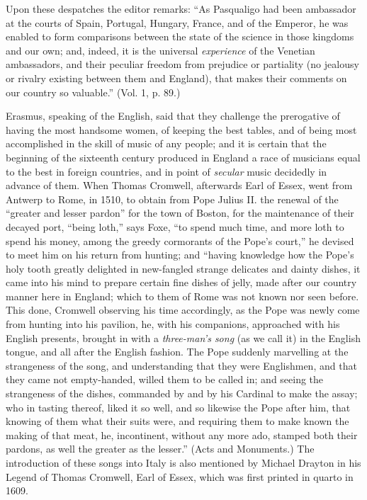 Upon these despatches the editor remarks: “As Pasqualigo had been ambassador
at the courts of Spain, Portugal, Hungary, France, and of the Emperor, he was
enabled to form comparisons between the state of the science in those kingdoms
and our own; and, indeed, it is the universal \textit{experience} of the Venetian ambassadors, 
and their peculiar freedom from prejudice or partiality (no jealousy or
rivalry existing between them and England), that makes their comments on our
country so valuable.” (Vol. 1, p. 89.)

Erasmus, speaking of the English, said that they challenge the prerogative of
having the most handsome women, of keeping the best tables, and of being most
accomplished in the skill of music of any people; and it is certain that the beginning
of the sixteenth century produced in England a race of musicians equal to
the best in foreign countries, and in point of \textit{secular} music decidedly in advance
of them. When Thomas Cromwell, afterwards Earl of Essex, went from Antwerp
to Rome, in 1510, to obtain from Pope Julius II. the renewal of the “greater and
lesser pardon”
for the town of Boston, for the \pagebreak 
maintenance of their decayed port,
“being loth,” says Foxe, “to spend much time, and more loth to spend his money,
among the greedy cormorants of the Pope’s court,” he devised to meet him on his
return from hunting; and “having knowledge how the Pope’s holy tooth greatly
delighted in new-fangled strange delicates and dainty dishes, it came into his
mind to prepare certain fine dishes of jelly, made after our country manner here
in England; which to them of Rome was not known nor seen before. This done,
Cromwell observing his time accordingly, as the Pope was newly come from
hunting into his pavilion, he, with his companions, approached with his English
presents, brought in with a \textit{three-man's song} (as we call it) in the English tongue,
and all after the English fashion. The Pope suddenly marvelling at the strangeness
of the song, and understanding that they were Englishmen, and that they
came not empty-handed, willed them to be called in; and seeing the strangeness of
the dishes, commanded by and by his Cardinal to make the assay; who in tasting
thereof, liked it so well, and so likewise the Pope after him, that knowing of them
what their suits were, and requiring them to make known the making of that meat,
he, incontinent, without any more ado, stamped both their pardons, as well the
greater as the lesser.” (Acts and Monuments.) The introduction of these songs
into Italy is also mentioned by Michael Drayton in his Legend of Thomas
Cromwell, Earl of Essex, which was first printed in quarto in 1609.

